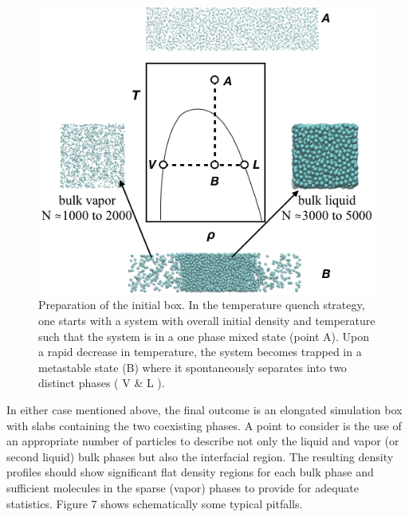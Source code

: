 \documentclass{scrbook}
\begin{document}
\begin{figure}
  \includegraphics[width=1\textwidth]{gfx/image19.png}
  \caption{Preparation of the initial box. In the temperature quench strategy, one starts with a system with overall initial density and temperature such that the system is in a one phase mixed state (point A). Upon a rapid decrease in temperature, the system becomes trapped in a metastable state (B) where it spontaneously separates into two distinct phases ( V \& L ). }
  \label{fig:4}
\end{figure}

In either case mentioned above, the final outcome is an elongated simulation
box with slabs containing the two coexisting phases. A point to consider is the
use of an appropriate number of particles to describe not only the liquid and
vapor (or second liquid) bulk phases but also the interfacial region. The
resulting density profiles should show significant flat density regions for
each bulk phase and sufficient molecules in the sparse (vapor) phases to
provide for adequate statistics. Figure 7 shows schematically some typical
pitfalls.
\end{document}
